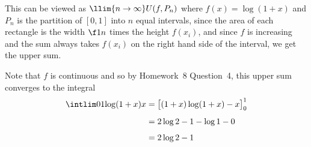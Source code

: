 \documentclass[a4paper]{article}
\begin{document}
This can be viewed as $\llim{n \to \infty} U(f, P_n)$ where $f(x) = \log(1 + x)$ and $P_n$ is the partition of $[0,1]$ into $n$ equal intervals, since the area of each rectangle is the width $\f1n$ times the height $f(x_i)$, and since $f$ is increasing and the sum always takes $f(x_i)$ on the right hand side of the interval, we get the upper sum.


Note that $f$ is continuous and so by Homework~8 Question~4, this upper sum converges to the integral \begin{align*}
\intlim 01 {\log(1 + x)} x &= {\big[ (1+x) \log (1+x) - x \big]}_0^1 \\[1ex]
&= 2 \log 2 - 1 - \log 1 - 0 \\[1ex]
&= 2 \log 2 - 1 %
\end{align*}

\end{document}
